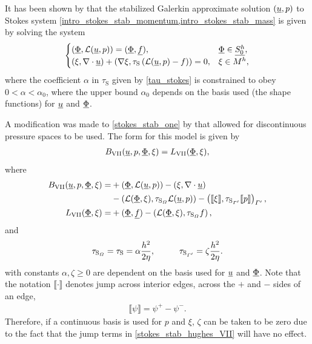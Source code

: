 It has been shown by \citet{hughes_1986} that the stabilized Galerkin approximate solution $(\underline{u}, p)$ to Stokes system \cref{intro_stokes_stab_momentum,intro_stokes_stab_mass} is given by solving the system
\begin{align}
  \label{stokes_stab_one}
  \begin{cases}
    \left( \underline{\Phi}, \mathcal{L} (\underline{u}, p) \right) = (\underline{\Phi}, \underline{f}), & \underline{\Phi} \in \underline{S_0^h}, \\
    \left( \xi, \nabla \cdot \underline{u} \right) + \left( \nabla \xi, \tau_{\text{S}} \left( \mathcal{L} (\underline{u}, p) - f \right) \right) = 0, & \xi \in M^h, 
  \end{cases}
\end{align}
where the coefficient $\alpha$ in $\tau_{\text{S}}$ given by \cref{tau_stokes} is constrained to obey $0 < \alpha < \alpha_0$, where the upper bound $\alpha_0$ depends on the basis used (the shape functions) for $\underline{u}$ and $\underline{\Phi}$.

A modification was made to \cref{stokes_stab_one} by \citet{hughes_1987} that allowed for discontinuous pressure spaces to be used.  The form for this model is given by
\begin{align}
  \label{stokes_stab_hughes_VII}
  B_{\text{VII}}(\underline{u},p,\underline{\Phi}, \xi) = L_{\text{VII}}(\underline{\Phi}, \xi),
\end{align}
where
\begin{align}
  \label{stokes_stab_hughes_VII_B}
  B_{\text{VII}}(\underline{u},p,\underline{\Phi}, \xi) = &+ \left( \underline{\Phi}, \mathcal{L} (\underline{u}, p) \right) - \left( \xi, \nabla \cdot \underline{u} \right) \notag \\
  &- \left( \mathcal{L} (\underline{\Phi}, \xi), \tau_{\text{S}_{\varOmega}} \mathcal{L} (\underline{u}, p) \right) - \left( \llbracket \xi \rrbracket, \tau_{\text{S}_{\varGamma'}} \llbracket p \rrbracket \right)_{\varGamma'}, \\
  \label{stokes_stab_hughes_VII_L}
  L_{\text{VII}}(\underline{\Phi}, \xi) = &+ ( \underline{\Phi}, \underline{f} ) - \left( \mathcal{L} (\underline{\Phi}, \xi), \tau_{\text{S}_{\varOmega}} f \right),
\end{align}
and 
\begin{align}
  \label{tau_stokes_VII}
  \tau_{\text{S}_{\Omega}} = \tau_{\text{S}} = \alpha \frac{h^2}{2\eta}, \hspace{10mm}
  \tau_{\text{S}_{\Gamma'}} = \zeta \frac{h^2}{2\eta}.
\end{align}
with constants $\alpha, \zeta \geq 0$ are dependent on the basis used for $\underline{u}$ and $\underline{\Phi}$.  Note that the notation $\llbracket \cdot \rrbracket$ denotes jump across interior edges, \ie across the $+$ and $-$ sides of an edge,
\begin{align*}
  \llbracket \psi \rrbracket = \psi^+ - \psi^-.
\end{align*}
Therefore, if a continuous basis is used for $p$ and $\xi$, $\zeta$ can be taken to be zero due to the fact that the jump terms in \cref{stokes_stab_hughes_VII} will have no effect.

